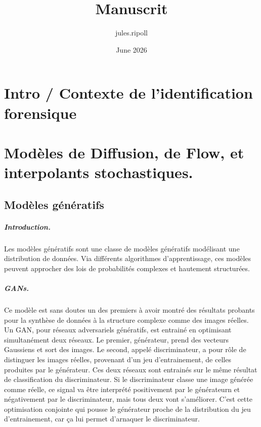 \documentclass[12pt,a4paper,oneside]{book} %
\title{Manuscrit}
\author{jules.ripoll}
\date{June 2026}
\begin{document}
\frontmatter %
\maketitle
\tableofcontents

\mainmatter %

\chapter{Intro / Contexte de l'identification forensique}

\chapter{Modèles de Diffusion, de Flow, et interpolants stochastiques.}

\section{Modèles génératifs}

\paragraph{Introduction.} 
Les modèles génératifs sont une classe de modèles génératifs modélisant une distribution de données. 
Via différents algorithmes d'apprentissage, ces modèles peuvent approcher des lois de probabilités complexes et hautement structurées. 

\paragraph{GANs.} Ce modèle est sans doutes un des premiers à avoir montré des résultats probants pour la synthèse de données à la structure complexe comme des images réelles. Un GAN, pour réseaux adversariels génératifs, est entrainé en optimisant simultanément deux réseaux. Le premier, générateur, prend des vecteurs Gaussiens et sort des images. Le second, appelé discriminateur, a pour rôle de distinguer les images réelles, provenant d'un jeu d'entrainement, de celles produites par le générateur. Ces deux réseaux sont entrainés sur le même résultat de classification du discriminateur. Si le discriminateur classe une image générée comme réelle, ce signal va être interprété positivement par le générateurn et négativement par le discriminateur, mais tous deux vont s'améliorer. C'est cette optimisation conjointe qui pousse le générateur proche de la distribution du jeu d'entrainement, car ça lui permet d'arnaquer le discriminateur.
\end{document}
